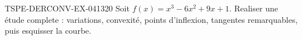 \begin{exercice}{TSPE-DERCONV-EX-041}{3}{20}
Soit $f(x) = x^3 - 6x^2 + 9x + 1$. Realiser une étude complete : variations, convexité, points d'inflexion, tangentes remarquables, puis esquisser la courbe.

\end{exercice}
